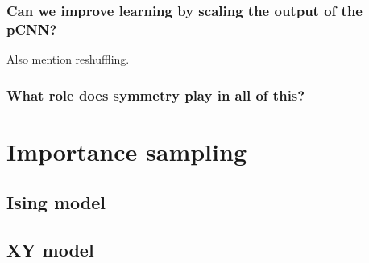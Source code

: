 \subsubsection{Can we improve learning by scaling the output of the pCNN?}
Also mention reshuffling.

\subsubsection{What role does symmetry play in all of this?}

\section{Importance sampling}

\subsection{Ising model}

\subsection{XY model}
